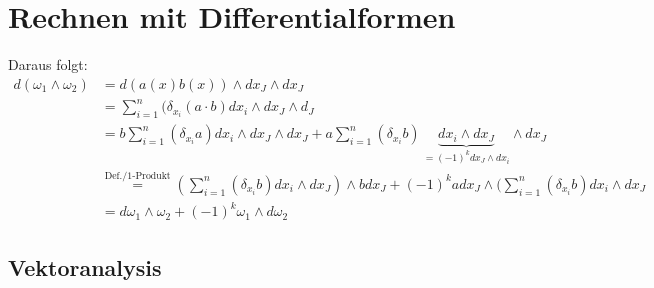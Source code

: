 %

\section{Rechnen mit Differentialformen}
\addtocounter{thmn}{1}
\setcounter{theorem}{0}

\begin{enum-arab}
\item
\item

Daraus folgt:
\begin{align*}
d(\omega_1 \land \omega_2)&=d(a(x) b(x))\wedge dx_J \wedge dx_J\\
&= \sum_{i=1}^n(\delta_{x_i}(a\cdot b) dx_i \wedge dx_J \wedge d_J\\
&= b\sum_{i=1}^n(\delta_{x_i} a) dx_i \wedge dx_J \wedge dx_J + a \sum_{i=1}^n (\delta_{x_i} b)\, \underbrace{dx_i \wedge dx_J}_{=(-1)^k dx_J \wedge dx_i}  \wedge dx_J \\
&\stackrel{\text{Def./1-Produkt}}=(\sum_{i=1}^n(\delta_{x_i}b) dx_i \wedge dx_J)\wedge bdx_J + (-1)^k a dx_J \wedge(\sum_{i=1}^n(\delta_{x_i} b) dx_i \wedge dx_J \\
&= d\omega_1 \wedge \omega_2+(-1)^k \omega_1 \wedge d\omega_2
\end{align*}
\item
\end{enum-arab}
\subsection{Vektoranalysis}


